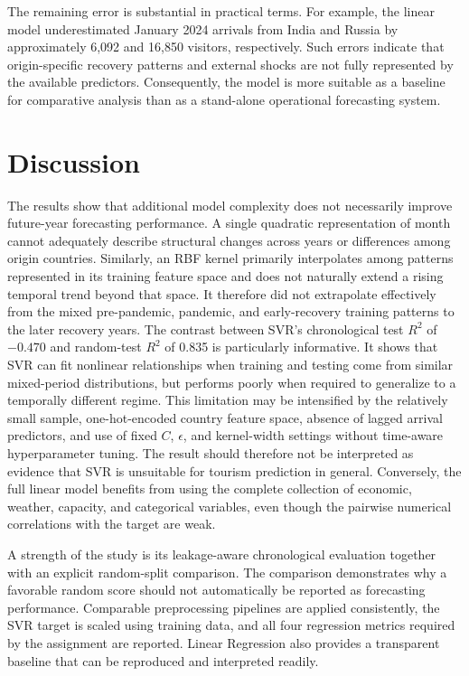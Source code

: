 \documentclass[conference,a4paper]{IEEEtran}
\begin{document}
The remaining error is substantial in practical terms. For example, the linear model underestimated January 2024 arrivals from India and Russia by approximately 6,092 and 16,850 visitors, respectively. Such errors indicate that origin-specific recovery patterns and external shocks are not fully represented by the available predictors. Consequently, the model is more suitable as a baseline for comparative analysis than as a stand-alone operational forecasting system.

\section{Discussion}
The results show that additional model complexity does not necessarily improve future-year forecasting performance. A single quadratic representation of month cannot adequately describe structural changes across years or differences among origin countries. Similarly, an RBF kernel primarily interpolates among patterns represented in its training feature space and does not naturally extend a rising temporal trend beyond that space. It therefore did not extrapolate effectively from the mixed pre-pandemic, pandemic, and early-recovery training patterns to the later recovery years. The contrast between SVR's chronological test $R^2$ of $-0.470$ and random-test $R^2$ of 0.835 is particularly informative. It shows that SVR can fit nonlinear relationships when training and testing come from similar mixed-period distributions, but performs poorly when required to generalize to a temporally different regime. This limitation may be intensified by the relatively small sample, one-hot-encoded country feature space, absence of lagged arrival predictors, and use of fixed $C$, $\epsilon$, and kernel-width settings without time-aware hyperparameter tuning. The result should therefore not be interpreted as evidence that SVR is unsuitable for tourism prediction in general. Conversely, the full linear model benefits from using the complete collection of economic, weather, capacity, and categorical variables, even though the pairwise numerical correlations with the target are weak.

A strength of the study is its leakage-aware chronological evaluation together with an explicit random-split comparison. The comparison demonstrates why a favorable random score should not automatically be reported as forecasting performance. Comparable preprocessing pipelines are applied consistently, the SVR target is scaled using training data, and all four regression metrics required by the assignment are reported. Linear Regression also provides a transparent baseline that can be reproduced and interpreted readily.
\end{document}
